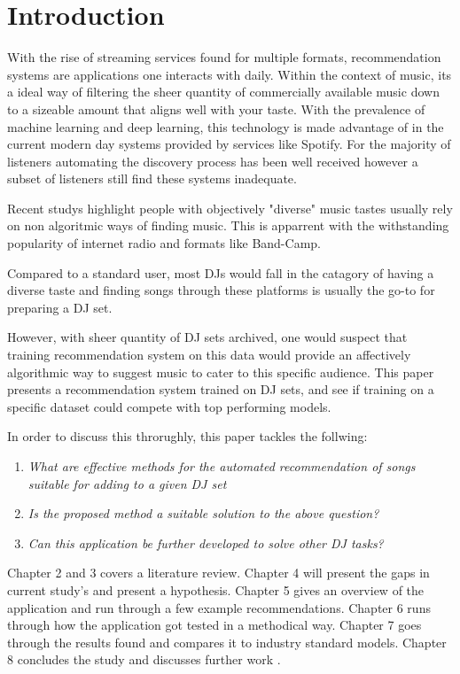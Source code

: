 
\graphicspath{{Chapter1/}}


\chapter{Introduction}
With the rise of streaming services found for multiple formats, recommendation systems are applications one interacts with daily. Within the context of music, its a ideal way of filtering the sheer quantity of commercially available music down to a sizeable amount that aligns well with your taste. With the prevalence of machine learning and deep learning, this technology is made advantage of in the current modern day systems provided by services like Spotify. For the majority of listeners automating the discovery process has been well received however a subset of listeners still find these systems inadequate.

Recent studys highlight people with objectively "diverse" music tastes usually rely on non algoritmic ways of finding music. This is apparrent with the withstanding popularity of internet radio and formats like Band-Camp. 

Compared to a standard user, most DJs would fall in the catagory of having a diverse taste and finding songs through these platforms is usually the go-to for preparing a DJ set.

However, with sheer quantity of DJ sets archived, one would suspect that training recommendation system on this data would provide an affectively algorithmic way to suggest music to cater to this specific audience. This paper presents a recommendation system trained on DJ sets, and see if training on a specific dataset could compete with top performing models.

In order to discuss this throrughly, this paper tackles the follwing:

\begin{enumerate}
	\item \textit{What are effective methods for the automated recommendation of songs suitable
		for adding to a given DJ set}
	\item \textit{Is the proposed method a suitable solution to the above question?}
	\item \textit{Can this application be further developed to solve other DJ tasks?}
\end{enumerate}

Chapter 2 and 3 covers a literature review. Chapter 4 will present the gaps in current study's and present a hypothesis. Chapter 5 gives an overview of the application and run through a few example recommendations. Chapter 6 runs through how the application got tested in a methodical way. Chapter 7 goes through the results found and compares it to industry standard models. Chapter 8 concludes the study and discusses further work .
 
